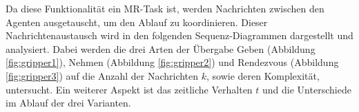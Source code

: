 Da diese Funktionalität ein MR-Task ist, werden Nachrichten zwischen den Agenten ausgetauscht, um den Ablauf zu koordinieren. Dieser Nachrichtenaustausch wird in den folgenden Sequenz-Diagrammen dargestellt und analysiert. Dabei werden die drei Arten der Übergabe Geben (Abbildung \ref{fig:gripper1}), Nehmen (Abbildung \ref{fig:gripper2}) und Rendezvous (Abbildung \ref{fig:gripper3}) auf die Anzahl der Nachrichten $k$, sowie deren Komplexität, untersucht. Ein weiterer Aspekt ist das zeitliche Verhalten $t$ und die Unterschiede im Ablauf der drei Varianten.

 \begin{figure}
 	\centering
 	\hfill
\end{figure}
